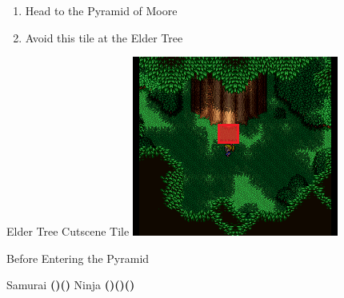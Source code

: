 \begin{paracol}{2}
\switchcolumn*
\begin{enumerate}[resume]
    \item Head to the Pyramid of Moore
    \item Avoid this tile at the Elder Tree
\end{enumerate}

\switchcolumn
\begin{misc}{Elder Tree Cutscene Tile}
    \includegraphics[scale=0.626]{../Graphics/Misc/19. Elder Tree Cutscene Tile.png}
\end{misc}

\switchcolumn
\begin{menu}{Before Entering the Pyramid}
    \varwb
    \begin{jobMenu}
        \cara Samurai \textbf{(\pointLeft)(\pointDown)} \ability{\dash} \optimize
        \faris Ninja \textbf{(\pointLeft)(\pointDown)(\pointLeft) \ability{!\gilToss}}
    \end{jobMenu}
    \begin{itemMenu}
        \hiPotionMenu {}
    \end{itemMenu}
    \varwe
\end{menu}

\end{paracol}